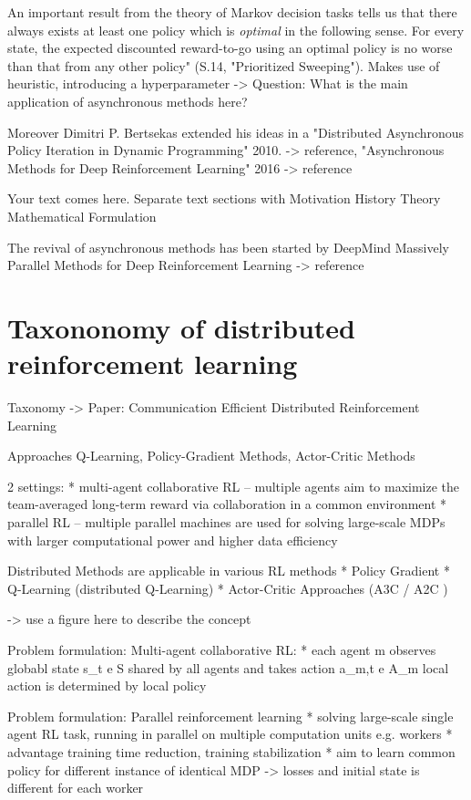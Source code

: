     An important result from the theory of Markov decision tasks tells us that there always exists at least one policy which is \textit{optimal} in the following  sense. For every state, the expected discounted reward-to-go using an optimal policy is no worse than that from any other policy" (S.14, "Prioritized Sweeping").
    Makes use of heuristic, introducing a hyperparameter 
    -> Question: What is the main application of asynchronous methods here?
    
    
    Moreover Dimitri P. Bertsekas extended his ideas in a "Distributed Asynchronous Policy Iteration in Dynamic Programming" 2010. -> reference,
   "Asynchronous Methods for Deep Reinforcement Learning" 2016 -> reference
    
    
    
    Your text comes here. Separate text sections with
    Motivation
    History
    Theory
    Mathematical Formulation
    
    
    The revival of asynchronous methods has been started by DeepMind
    Massively Parallel Methods for Deep Reinforcement Learning -> reference
    
    \section{Taxononomy of distributed reinforcement learning}
    Taxonomy -> Paper: Communication Efficient Distributed Reinforcement Learning
    
    Approaches Q-Learning, Policy-Gradient Methods, Actor-Critic Methods
    
    2 settings:
    * multi-agent collaborative RL
    -- multiple agents aim to maximize the team-averaged long-term reward via collaboration in a common environment
    * parallel RL
    -- multiple parallel machines are used for solving large-scale MDPs with larger computational power and higher data efficiency
    
    Distributed Methods are applicable in various RL methods
    * Policy Gradient 
    * Q-Learning (distributed Q-Learning)
    * Actor-Critic Approaches (A3C / A2C )
    
    -> use a figure here to describe the concept
    
    Problem formulation: Multi-agent collaborative RL:
    * each agent m observes globabl state s\_t e S shared by all agents and takes action a\_m,t e A\_m 
    local action is determined by local policy
    
    Problem formulation: Parallel reinforcement learning
    * solving large-scale single agent RL task, running in parallel on multiple computation units e.g. workers
    * advantage training time reduction, training stabilization
    * aim to learn common policy for different instance of identical  MDP
    -> losses and initial state is different for each worker
    

